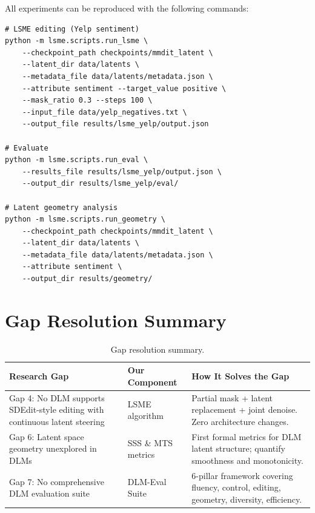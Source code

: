\documentclass{article}
\begin{document}
All experiments can be reproduced with the following commands:
\begin{verbatim}
# LSME editing (Yelp sentiment)
python -m lsme.scripts.run_lsme \
    --checkpoint_path checkpoints/mmdit_latent \
    --latent_dir data/latents \
    --metadata_file data/latents/metadata.json \
    --attribute sentiment --target_value positive \
    --mask_ratio 0.3 --steps 100 \
    --input_file data/yelp_negatives.txt \
    --output_file results/lsme_yelp/output.json

# Evaluate
python -m lsme.scripts.run_eval \
    --results_file results/lsme_yelp/output.json \
    --output_dir results/lsme_yelp/eval/

# Latent geometry analysis
python -m lsme.scripts.run_geometry \
    --checkpoint_path checkpoints/mmdit_latent \
    --latent_dir data/latents \
    --metadata_file data/latents/metadata.json \
    --attribute sentiment \
    --output_dir results/geometry/
\end{verbatim}

\section{Gap Resolution Summary}
\label{app:gaps}


\begin{table}[h]
\centering
\caption{Gap resolution summary.}
\small
\begin{tabular}{p{3.5cm}p{2.5cm}p{5.5cm}}
\toprule
\textbf{Research Gap} & \textbf{Our Component} & \textbf{How It Solves the Gap} \\
\midrule
Gap 4: No DLM supports SDEdit-style editing with continuous latent steering & LSME algorithm & Partial mask + latent replacement + joint denoise. Zero architecture changes. \\
\addlinespace
Gap 6: Latent space geometry unexplored in DLMs & SSS \& MTS metrics & First formal metrics for DLM latent structure; quantify smoothness and monotonicity. \\
\addlinespace
Gap 7: No comprehensive DLM evaluation suite & DLM-Eval Suite & 6-pillar framework covering fluency, control, editing, geometry, diversity, efficiency. \\
\bottomrule
\end{tabular}
\end{table}
\end{document}
